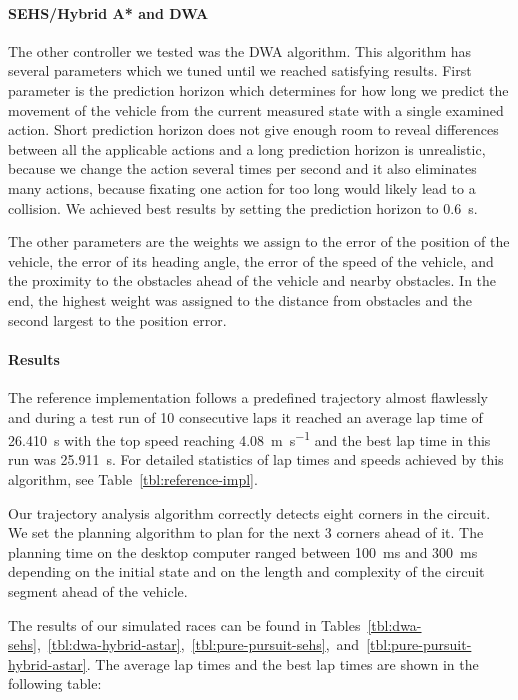 \paragraph{\gls{SEHS}/Hybrid A* and \gls{DWA}}
The other controller we tested was the \gls{DWA} algorithm. This algorithm has several parameters which we tuned until we reached satisfying results. First parameter is the prediction horizon which determines for how long we predict the movement of the vehicle from the current measured state with a single examined action. Short prediction horizon does not give enough room to reveal differences between all the applicable actions and a long prediction horizon is unrealistic, because we change the action several times per second and it also eliminates many actions, because fixating one action for too long would likely lead to a collision. We achieved best results by setting the prediction horizon to \SI{0.6}{\second}.

The other parameters are the weights we assign to the error of the position of the vehicle, the error of its heading angle, the error of the speed of the vehicle, and the proximity to the obstacles ahead of the vehicle and nearby obstacles. In the end, the highest weight was assigned to the distance from obstacles and the second largest to the position error.

\paragraph{Results}

The reference implementation follows a predefined trajectory almost flawlessly and during a test run of 10 consecutive laps it reached an average lap time of \SI{26.410}{\second} with the top speed reaching \SI{4.08}{\meter\per\second} and the best lap time in this run was \SI{25.911}{\second}. For detailed statistics of lap times and speeds achieved by this algorithm, see Table~\ref{tbl:reference-impl}.

Our trajectory analysis algorithm correctly detects eight corners in the circuit. We set the planning algorithm to plan for the next 3 corners ahead of it. The planning time on the desktop computer ranged between \SI{100}{\milli\second} and \SI{300}{\milli\second} depending on the initial state and on the length and complexity of the circuit segment ahead of the vehicle.

The results of our simulated races can be found in Tables~\ref{tbl:dwa-sehs},~\ref{tbl:dwa-hybrid-astar},~\ref{tbl:pure-pursuit-sehs},~and~\ref{tbl:pure-pursuit-hybrid-astar}. The average lap times and the best lap times are shown in the following table:


